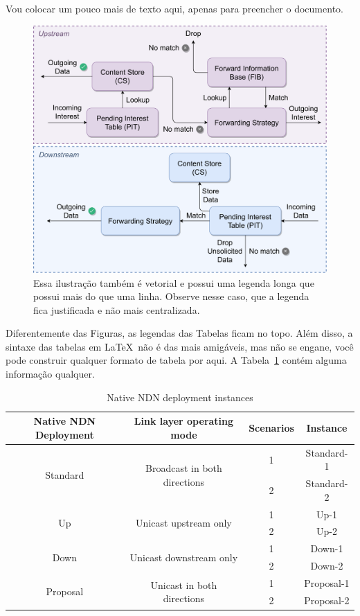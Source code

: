 \documentclass[portuguese,noindentfirst]{UASTeX} %
\begin{document}
Vou colocar um pouco mais de texto aqui, apenas para preencher o documento. \lipsum[1-3]

\begin{figure}[ht]
	\centering
	\includegraphics[width=.6\textwidth]{images/illustrations/packet_forwarding}
	\caption{Essa ilustração também é vetorial e possui uma legenda longa que possui mais do que uma linha. Observe nesse caso, que a legenda fica justificada e não mais centralizada.}
	\label{fig:packet_forwarding}
\end{figure}

Diferentemente das Figuras, as legendas das Tabelas ficam no topo. Além disso, a sintaxe das tabelas em \LaTeX~não é das mais amigáveis, mas não se engane, você pode construir qualquer formato de tabela por aqui. A Tabela~\ref{tab:list_evaluated_scenarios} contém alguma informação qualquer.

\begin{table}[htbp]
	\centering
	\caption{Native \ac{NDN} deployment instances}
	\begin{tabular}{cccc}
		\hline Native \ac{NDN} Deployment & Link layer operating mode & Scenarios & Instance\\ 
		\hline
		\hline \multirow{2}{*}{Standard} & \multirow{2}{*}{Broadcast in both directions} & 1 & Standard-1  \\
		\cline{3-4} & & 2 & Standard-2 \\
		\hline \multirow{2}{*}{Up} & \multirow{2}{*}{Unicast upstream only} & 1 & Up-1   \\
		\cline{3-4} & & 2 & Up-2   \\
		\hline \multirow{2}{*}{Down} & \multirow{2}{*}{Unicast downstream only} & 1 & Down-1   \\
		\cline{3-4} & & 2 & Down-2   \\
		\hline \multirow{2}{*}{Proposal} & \multirow{2}{*}{Unicast in both directions} & 1 & Proposal-1   \\
		\cline{3-4} & & 2 & Proposal-2   \\
		\hline
	\end{tabular}
	\label{tab:list_evaluated_scenarios}
\end{table}
\end{document}
